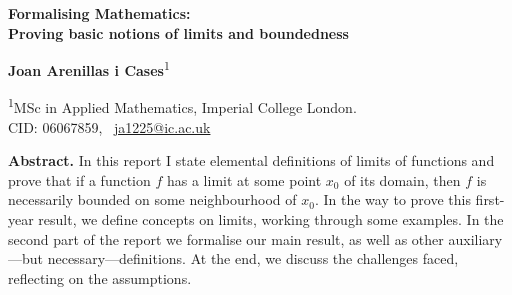 \documentclass[a4paper,11pt]{article}
\theoremstyle{plain}
\newcommand{\R}{\ensuremath{\mathbb{R}}} %
\begin{document}
	\sffamily
	
	\begin{center}
		{\LARGE\bfseries
			Formalising Mathematics: \\[0.3em]
			Proving basic notions of limits and boundedness\\[0.3em]
			\par}
	\end{center}
	
	\vspace{0.4cm}
	
	\begin{center}
		\textbf{Joan Arenillas i Cases}\textsuperscript{1}
	\end{center}
	
	\vspace{0.5cm}
	
	\noindent
	\textsuperscript{1}MSc in Applied Mathematics, Imperial College London.\\
	CID: 06067859, \ \href{mailto:ja1225@ic.ac.uk}{ja1225@ic.ac.uk}
	
	\vspace{0.6cm}
	
	\vspace{0.5cm}
	
	\noindent
	\textbf{Abstract.}
	In this report I state elemental definitions of limits of functions and prove that if a function $f$ has a limit at some point $x_0$ of its domain, then $f$ is necessarily bounded on some neighbourhood of $x_0$. In the way to prove this first-year result, we define concepts on limits, working through some examples. In the second part of the report we formalise our main result, as well as other auxiliary---but necessary---definitions. At the end, we discuss the challenges faced, reflecting on the assumptions.
	
	\vspace{0.5cm}
	
\end{document}
